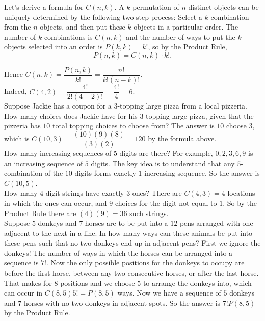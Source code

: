 \documentclass[12pt]{amsart}
\theoremstyle{definition}
\theoremstyle{remark}
\begin{document}
Let's derive a formula for $C(n,k)$.  A $k$-permutation of $n$ distinct objects can be uniquely determined by the following two step process:  Select a $k$-combination from the $n$ objects, and then put these $k$ objects in a particular order.  The number of $k$-combinations is $C(n,k)$ and the number of ways to put the $k$ objects selected into an order is $P(k,k)=k!$, so by the Product Rule,  $$P(n,k)=C(n,k)\cdot k!.$$


Hence $C(n,k)=\dfrac{P(n,k)}{k!}=\dfrac{n!}{k!(n-k)!}.$\\

Indeed, $C(4,2)=\dfrac{4!}{2!(4-2)!}=\dfrac{4!}{4}=6$.\\

Suppose Jackie has a coupon for a $3$-topping large pizza from a local pizzeria.  How many choices does Jackie have for his $3$-topping large pizza, given that the pizzeria has $10$ total topping choices to choose from?   The answer is $10$ choose $3$, which is  $C(10,3)=\dfrac{(10)(9)(8)}{(3)(2)}=120$ by the formula above.\\

How many increasing sequences of $5$ digits are there?  For example, $0,2,3,6,9$ is an increasing sequence of $5$ digits.  The key idea is to understand that any $5$-combination of the $10$ digits forms exactly $1$ increasing sequence.  So the answer is $C(10,5)$.  \\

How many $4$-digit strings have exactly $3$ ones?  There are $C(4,3)=4$ locations in which the ones can occur, and $9$ choices for the digit not equal to $1$.  So by the Product Rule there are $(4)(9)=36$ such strings.\\

Suppose $5$ donkeys and $7$ horses are to be put into a $12$ pens arranged with one adjacent to the next in a line.  In how many ways can these animals be put into these pens such that no two donkeys end up in adjacent pens?  First we ignore the donkeys!  The number of ways in which the horses can be arranged into a sequence is $7!$.  Now the only possible positions for the donkeys to occupy are before the first horse, between any two consecutive horses, or after the last horse.  That makes for $8$ positions and we choose $5$ to arrange the donkeys into, which can occur in $C(8,5)5!=P(8,5)$ ways.  Now we have a sequence of $5$ donkeys and $7$ horses with no two donkeys in adjacent spots.  So the answer is $7! P(8,5)$ by the Product Rule.\\
\end{document}
